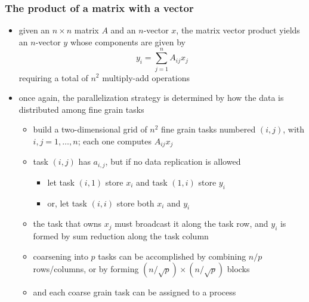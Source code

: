 \begin{frame}[fragile]
%
  \frametitle{The product of a matrix with a vector}
%
  \begin{itemize}
%
  \item given an $n \times n$ matrix $A$ and an $n$-vector $x$, the matrix vector product
    yields an $n$-vector $y$ whose components are given by
    \begin{equation}
      y_{i} = \sum_{j=1}^{n} A_{ij} x_{j}
    \end{equation}
    requiring a total of $n^{2}$ multiply-add operations
%
  \item once again, the parallelization strategy is determined by how the data is distributed
    among fine grain tasks
    \begin{itemize}
    \item build a two-dimensional grid of $n^{2}$ fine grain tasks numbered $(i,j)$, with $i,j
      = 1, \ldots, n$; each one computes $A_{ij}x_{j}$
    \item task $(i,j)$ has $a_{i,j}$, but if no data replication is allowed
      \begin{itemize}
      \item let task $(i,1)$ store $x_{i}$ and task $(1,i)$ store $y_{i}$
      \item or, let task $(i,i)$ store both $x_{i}$ and $y_{i}$
      \end{itemize}
    \item the task that owns $x_{j}$ must broadcast it along the  task row, and $y_{i}$
      is formed by sum reduction along the  task column
    \item coarsening into $p$ tasks can be accomplished by combining $n/p$ rows/columns, or by
      forming $(n/\sqrt{p}) \times (n/\sqrt{p})$ blocks
    \item and each coarse grain task can be assigned to a process
    \end{itemize}
%
  \end{itemize}
%
\end{frame}

